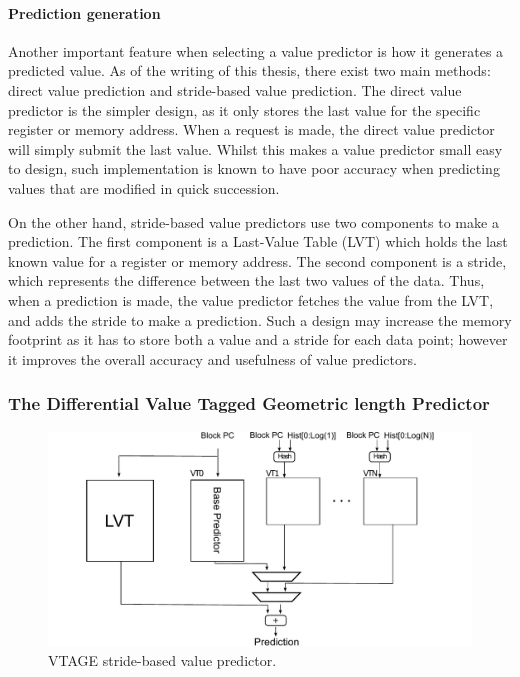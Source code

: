 \paragraph*{Prediction generation} Another important feature when selecting a value predictor is how it generates a predicted value.
As of the writing of this thesis, there exist two main methods: direct value prediction and stride-based value prediction.
The direct value predictor is the simpler design, as it only stores the last value for the specific register or memory address.
When a request is made, the direct value predictor will simply submit the last value.
Whilst this makes a value predictor small easy to design, such implementation is known to have poor accuracy when predicting values that are modified in quick succession.

On the other hand, stride-based value predictors use two components to make a prediction.
The first component is a Last-Value Table (LVT) which holds the last known value for a register or memory address.
The second component is a stride, which represents the difference between the last two values of the data.
Thus, when a prediction is made, the value predictor fetches the value from the LVT, and adds the stride to make a prediction.
Such a design may increase the memory footprint as it has to store both a value and a stride for each data point; however it improves the overall accuracy and usefulness of value predictors.

\subsubsection{The Differential Value Tagged Geometric length Predictor}
\begin{figure}[t]
    \centering
    \includegraphics[width=1\textwidth]{chapter3/graphics/basic_valpred.pdf}

    \caption{VTAGE stride-based value predictor.}
    \label{fig:stride_over}
\end{figure}

